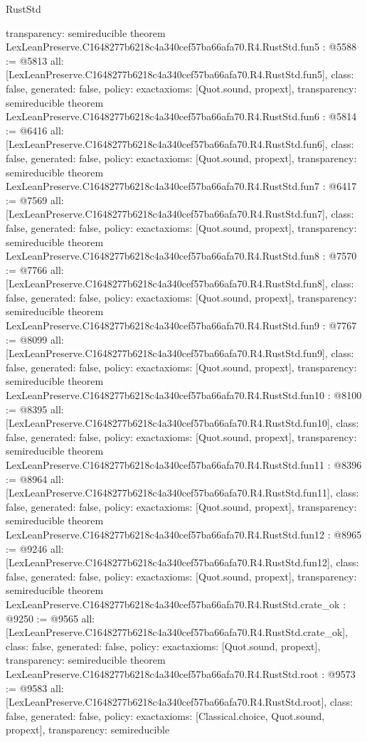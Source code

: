 \begin{lexlean}{RustStd}
\begin{coremodule}
{  transparency: semireducible
}
theorem LexLeanPreserve.C1648277b6218c4a340cef57ba66afa70.R4.RustStd.fun5 : @5588 := @5813 {
  all: [LexLeanPreserve.C1648277b6218c4a340cef57ba66afa70.R4.RustStd.fun5],
  class: false,
  generated: false,
  policy: exact{axioms: [Quot.sound, propext]},
  transparency: semireducible
}
theorem LexLeanPreserve.C1648277b6218c4a340cef57ba66afa70.R4.RustStd.fun6 : @5814 := @6416 {
  all: [LexLeanPreserve.C1648277b6218c4a340cef57ba66afa70.R4.RustStd.fun6],
  class: false,
  generated: false,
  policy: exact{axioms: [Quot.sound, propext]},
  transparency: semireducible
}
theorem LexLeanPreserve.C1648277b6218c4a340cef57ba66afa70.R4.RustStd.fun7 : @6417 := @7569 {
  all: [LexLeanPreserve.C1648277b6218c4a340cef57ba66afa70.R4.RustStd.fun7],
  class: false,
  generated: false,
  policy: exact{axioms: [Quot.sound, propext]},
  transparency: semireducible
}
theorem LexLeanPreserve.C1648277b6218c4a340cef57ba66afa70.R4.RustStd.fun8 : @7570 := @7766 {
  all: [LexLeanPreserve.C1648277b6218c4a340cef57ba66afa70.R4.RustStd.fun8],
  class: false,
  generated: false,
  policy: exact{axioms: [Quot.sound, propext]},
  transparency: semireducible
}
theorem LexLeanPreserve.C1648277b6218c4a340cef57ba66afa70.R4.RustStd.fun9 : @7767 := @8099 {
  all: [LexLeanPreserve.C1648277b6218c4a340cef57ba66afa70.R4.RustStd.fun9],
  class: false,
  generated: false,
  policy: exact{axioms: [Quot.sound, propext]},
  transparency: semireducible
}
theorem LexLeanPreserve.C1648277b6218c4a340cef57ba66afa70.R4.RustStd.fun10 : @8100 := @8395 {
  all: [LexLeanPreserve.C1648277b6218c4a340cef57ba66afa70.R4.RustStd.fun10],
  class: false,
  generated: false,
  policy: exact{axioms: [Quot.sound, propext]},
  transparency: semireducible
}
theorem LexLeanPreserve.C1648277b6218c4a340cef57ba66afa70.R4.RustStd.fun11 : @8396 := @8964 {
  all: [LexLeanPreserve.C1648277b6218c4a340cef57ba66afa70.R4.RustStd.fun11],
  class: false,
  generated: false,
  policy: exact{axioms: [Quot.sound, propext]},
  transparency: semireducible
}
theorem LexLeanPreserve.C1648277b6218c4a340cef57ba66afa70.R4.RustStd.fun12 : @8965 := @9246 {
  all: [LexLeanPreserve.C1648277b6218c4a340cef57ba66afa70.R4.RustStd.fun12],
  class: false,
  generated: false,
  policy: exact{axioms: [Quot.sound, propext]},
  transparency: semireducible
}
theorem LexLeanPreserve.C1648277b6218c4a340cef57ba66afa70.R4.RustStd.crate_ok : @9250 := @9565 {
  all: [LexLeanPreserve.C1648277b6218c4a340cef57ba66afa70.R4.RustStd.crate_ok],
  class: false,
  generated: false,
  policy: exact{axioms: [Quot.sound, propext]},
  transparency: semireducible
}
theorem LexLeanPreserve.C1648277b6218c4a340cef57ba66afa70.R4.RustStd.root : @9573 := @9583 {
  all: [LexLeanPreserve.C1648277b6218c4a340cef57ba66afa70.R4.RustStd.root],
  class: false,
  generated: false,
  policy: exact{axioms: [Classical.choice, Quot.sound, propext]},
  transparency: semireducible
}


\end{coremodule}
\end{lexlean}
